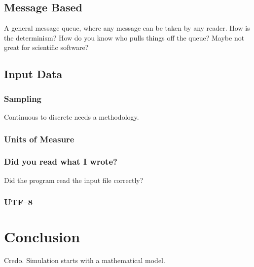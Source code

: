 \documentclass{article}
\begin{document}
\subsection{Message Based}
A general message queue, where any message can be taken by any reader.
How is the determinism? How do you know who pulls things off the queue?
Maybe not great for scientific software?

\subsection{Input Data}

\subsubsection{Sampling}
Continuous to discrete needs a methodology.

\subsubsection{Units of Measure}

\subsubsection{Did you read what I wrote?}
Did the program read the input file correctly?

\subsubsection{UTF--8}



\section{Conclusion}
Credo. Simulation starts with a mathematical model.




\end{document}
